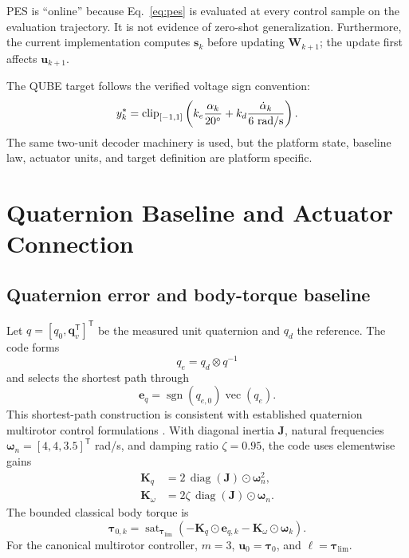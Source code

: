\documentclass[10pt,twocolumn]{article}
\newcommand{\sat}{\operatorname{sat}}
\newcommand{\clip}{\operatorname{clip}}
\newcommand{\sgn}{\operatorname{sgn}}
\newcommand{\T}{^{\mathsf T}}
\begin{document}
PES is ``online'' because Eq.~\eqref{eq:pes} is evaluated at every control
sample on the evaluation trajectory. It is not evidence of zero-shot
generalization. Furthermore, the current implementation computes $\bm s_k$
before updating $\bm W_{k+1}$; the update first affects $\bm u_{k+1}$.

The QUBE target follows the verified voltage sign convention:
\begin{equation}
    y_k^*=\clip_{[-1,1]}\left(
    k_e\frac{\alpha_k}{20^\circ}
    +k_d\frac{\dot\alpha_k}{6\ {\rm rad/s}}\right).
\end{equation}
The same two-unit decoder machinery is used, but the platform state, baseline
law, actuator units, and target definition are platform specific.

\section{Quaternion Baseline and Actuator Connection}

\subsection{Quaternion error and body-torque baseline}

Let $q=[q_0,\bm q_v\T]\T$ be the measured unit quaternion and $q_d$ the
reference. The code forms
\begin{equation}
    q_e=q_d\otimes q^{-1}
\end{equation}
and selects the shortest path through
\begin{equation}
    \bm e_q=\sgn(q_{e,0})\operatorname{vec}(q_e).
\end{equation}
This shortest-path construction is consistent with established quaternion
multirotor control formulations \cite{fresk2013quaternion}. With diagonal
inertia $\bm J$, natural frequencies
$\bm\omega_n=[4,4,3.5]\T$ rad/s, and damping ratio $\zeta=0.95$, the code uses
elementwise gains
\begin{align}
    \bm K_q &= 2\,\operatorname{diag}(\bm J)
    \odot\bm\omega_n^2,\\
    \bm K_\omega &=2\zeta\,\operatorname{diag}(\bm J)
    \odot\bm\omega_n.
\end{align}
The bounded classical body torque is
\begin{equation}
    \bm\tau_{0,k}=\sat_{\bm\tau_{\lim}}
    (-\bm K_q\odot\bm e_{q,k}
    -\bm K_\omega\odot\bm\omega_k).
\end{equation}
For the canonical multirotor controller, $m=3$,
$\bm u_0=\bm\tau_0$, and $\bm\ell=\bm\tau_{\lim}$.
\end{document}
